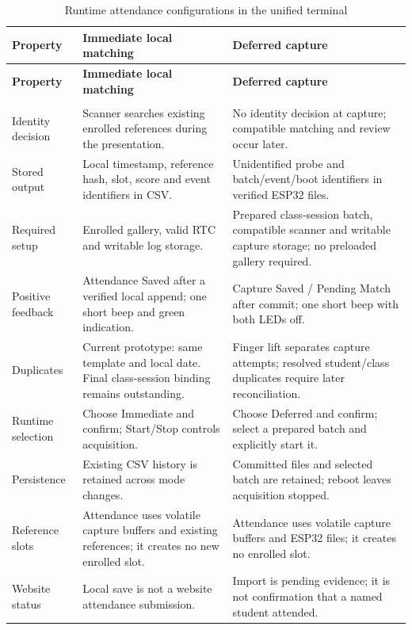 \begingroup
\singlespacing%
\setlength{\tabcolsep}{4pt}
\begin{longtable}{@{}>{\RaggedRight\arraybackslash}p{}>{\RaggedRight\arraybackslash}p{}>{\RaggedRight\arraybackslash}p{}@{}}
\caption{Runtime attendance configurations in the unified terminal}\label{tab:attendance-runtime-modes}\\
\toprule
\textbf{Property} & \textbf{Immediate local matching} & \textbf{Deferred capture} \\
\midrule\endfirsthead%
\toprule
\textbf{Property} & \textbf{Immediate local matching} & \textbf{Deferred capture} \\
\midrule\endhead%
\midrule\multicolumn{3}{r}{Continued on next page}\\\endfoot%
\bottomrule\endlastfoot%
Identity decision & Scanner searches existing enrolled references during the presentation. & No identity decision at capture; compatible matching and review occur later. \\ \addlinespace
Stored output & Local timestamp, reference hash, slot, score and event identifiers in CSV. & Unidentified probe and batch/event/boot identifiers in verified ESP32 files. \\ \addlinespace
Required setup & Enrolled gallery, valid RTC and writable log storage. & Prepared class-session batch, compatible scanner and writable capture storage; no preloaded gallery required. \\ \addlinespace
Positive feedback & Attendance Saved after a verified local append; one short beep and green indication. & Capture Saved / Pending Match after commit; one short beep with both LEDs off. \\ \addlinespace
Duplicates & Current prototype: same template and local date. Final class-session binding remains outstanding. & Finger lift separates capture attempts; resolved student/class duplicates require later reconciliation. \\ \addlinespace
Runtime selection & Choose Immediate and confirm; Start/Stop controls acquisition. & Choose Deferred and confirm; select a prepared batch and explicitly start it. \\ \addlinespace
Persistence & Existing CSV history is retained across mode changes. & Committed files and selected batch are retained; reboot leaves acquisition stopped. \\ \addlinespace
Reference slots & Attendance uses volatile capture buffers and existing references; it creates no new enrolled slot. & Attendance uses volatile capture buffers and ESP32 files; it creates no enrolled slot. \\ \addlinespace
Website status & Local save is not a website attendance submission. & Import is pending evidence; it is not confirmation that a named student attended. \\
\end{longtable}
\endgroup
